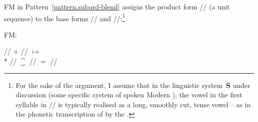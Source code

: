 \documentclass[output=paper
  ,nobabel
  ,draftmode
  ,colorlinks, citecolor=brown
]{langscibook}
\begin{document}
\largerpage[-1]
FM in Pattern \ref{pattern.subord-blend} assigns the
product form //
(a unit sequence) to the base forms // and //:\footnote{For the sake of the argument, I
assume that in the linguistic system $\mathbf{S}$ under discussion (some specific system of spoken Modern ), the
vowel in the first syllable in // is typically realised as a long, smoothly
cut, tense vowel – as in the phonetic transcription of \emph{} by the \citet[872]{dudenredaktion:2015:duden:aussprachewoerterbuch}.}
\begin{exe}
\ex \label{displayed.fm-naturlaub}\raggedright
\begin{labeledlist}{FM:}
\item[FM:] \raggedright // $+$ //
$↦$\\*{}
// $⁐$ //
$=$ //
\end{labeledlist}
\end{exe}
\pagebreak
\noindent
\end{document}
